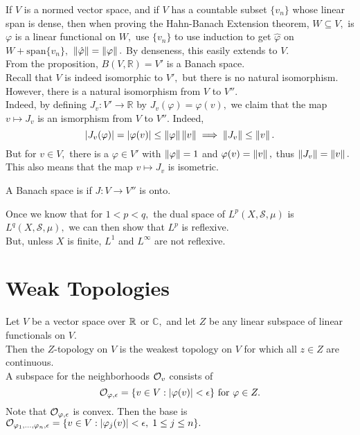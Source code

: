 \noindent If $V$ is a normed vector space, and if $V$ has a countable subset $\{v_n\}$ whose linear span is dense, then when proving the Hahn-Banach Extension theorem, $W\subseteq V,$ is $\varphi$ is a linear functional on $W,$ use $\{v_n\}$ to use induction to get $\hat{\varphi}$ on $W+\text{span}\{v_n\},$ $\left\lVert\hat{\varphi}\right\rVert=\left\lVert\varphi\right\rVert.$ By denseness, this easily extends to $V.$ \\ 

\noindent From the proposition, $B(V,\mathbb{R})=V'$ is a Banach space. \\
Recall that $V$ is indeed isomorphic to $V',$ but there is no natural isomorphism. However, there is a natural isomorphism from $V$ to $V''.$ \\
Indeed, by defining $J_v:V'\rightarrow\mathbb{R}$ by $J_v(\varphi)=\varphi(v),$ we claim that the map $v\mapsto J_v$ is an ismorphism from $V$ to $V''.$ Indeed,
$$|J_v(\varphi)|=|\varphi(v)|\leq\left\lVert\varphi\right\rVert\left\lVert v\right\rVert\implies \left\lVert J_v\right\rVert\leq\left\lVert v\right\rVert.$$
But for $v\in V,$ there is a $\varphi\in V'$ with $\left\lVert\varphi\right\rVert=1$ and $\varphi(v)=\left\lVert v\right\rVert,$ thus $\left\lVert J_v\right\rVert=\left\lVert v\right\rVert.$ This also means that the map $v\mapsto J_v$ is isometric.

\begin{defn}
A Banach space is  if $J:V\rightarrow V''$ is onto.
\end{defn}

\noindent
{} Once we know that for $1<p<q,$ the dual space of $L^p(X,\mathcal{S},\mu)$ is $L^q(X,\mathcal{S},\mu),$ we can then show that $L^p$ is reflexive.\\
But, unless $X$ is finite, $L^1$ and $L^{\infty}$ are not reflexive.

\section{Weak Topologies}
Let $V$ be a vector space over $\mathbb{R}^{}$ or $\mathbb{C},$ and let $Z$ be any linear subspace of linear functionals on $V.$ \\
Then the $Z$-topology on $V$ is the weakest topology on $V$ for which all $z\in Z$ are continuous. \\
A subspace for the neighborhoods $\mathcal{O}_v$ consists of 
$$\mathcal{O}_{\varphi,\epsilon}=\{v\in V:|\varphi(v)|<\epsilon\} \text{ for } \varphi\in Z.$$
Note that $\mathcal{O}_{\varphi,\epsilon}$ is convex. Then the base is $\mathcal{O}_{\varphi_1,...,\varphi_n,\epsilon}=\{v\in V:|\varphi_j(v)|<\epsilon,\;1\leq j\leq n\}.$\\

